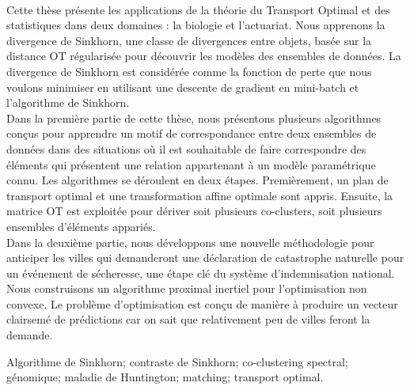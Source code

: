 
\\

Cette thèse présente les applications de la théorie du Transport Optimal et des statistiques dans deux domaines : la biologie et l'actuariat. Nous apprenons la divergence de Sinkhorn, une classe de divergences entre objets, basée sur la distance OT régularisée pour découvrir les modèles des ensembles de données. La divergence de Sinkhorn est considérée comme la fonction de perte que nous voulons minimiser en utilisant une descente de gradient en mini-batch et l'algorithme de Sinkhorn.\\
Dans la première partie de cette thèse, nous présentons plusieurs algorithmes conçus pour apprendre un motif de correspondance entre deux ensembles de données dans des situations où il est souhaitable de faire correspondre des éléments qui présentent une relation appartenant à un modèle paramétrique connu. Les algorithmes se déroulent en deux étapes. Premièrement, un plan de transport optimal et une transformation affine optimale sont appris. Ensuite, la matrice OT est exploitée pour dériver soit plusieurs co-clusters, soit plusieurs ensembles d'éléments appariés.\\
Dans la deuxième partie, nous développons une nouvelle méthodologie pour anticiper les villes qui demanderont une déclaration de catastrophe naturelle pour un événement de sécheresse, une étape clé du système d'indemnisation national. Nous construisons un algorithme proximal inertiel pour l'optimisation non convexe. Le problème d'optimisation est conçu de manière à produire un vecteur clairsemé de prédictions car on sait que relativement peu de villes feront la demande.


 Algorithme de Sinkhorn; contraste de Sinkhorn; co-clustering spectral; g\'enomique; maladie de Huntington; matching; transport optimal.



